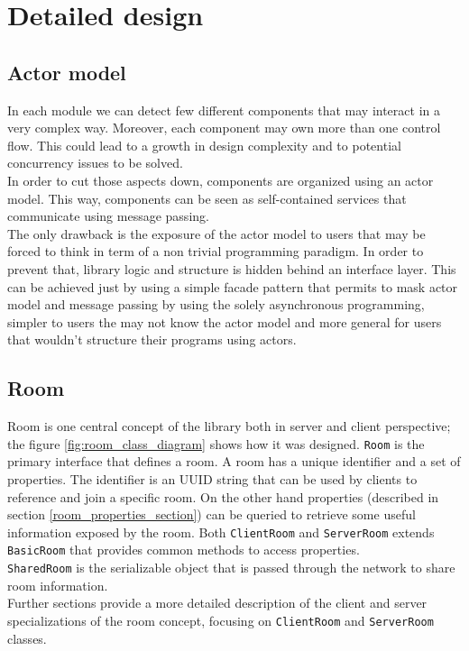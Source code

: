 \chapter{Detailed design}

\section{Actor model}

In each module we can detect few different components that may interact in a very complex way. Moreover, each component may own more than one control flow. This could lead to a growth in design complexity and to potential concurrency issues to be solved.
\\
In order to cut those aspects down, components are organized using an actor model. This way, components can be seen as self-contained services that communicate using message passing.
\\
The only drawback is the exposure of the actor model to users that may be forced to think in term of a non trivial programming paradigm. In order to prevent that, library logic and structure is hidden behind an interface layer. This can be achieved just by using a simple facade pattern that permits to mask actor model and message passing by using the solely asynchronous programming, simpler to users the may not know the actor model and more general for users that wouldn't structure their programs using actors.

\section{Room}

Room is one central concept of the library both in server and client perspective; the figure \ref{fig:room_class_diagram} shows how it was designed. 
 \texttt{Room} is the primary interface that defines a room. A room has a unique identifier and a set of properties. The identifier is an UUID string that can be used by clients to reference and join a specific room. On the other hand properties (described in section \ref{room_properties_section}) can be queried to retrieve some useful information exposed by the room. 
Both \texttt{ClientRoom} and \texttt{ServerRoom} extends \texttt{BasicRoom} that provides common methods to access properties.
 \\
\texttt{SharedRoom} is the serializable object that is passed through the network to share room information. 
\\
Further sections provide a more detailed description of the client and server specializations of the room concept, focusing on \texttt{ClientRoom} and \texttt{ServerRoom} classes.



